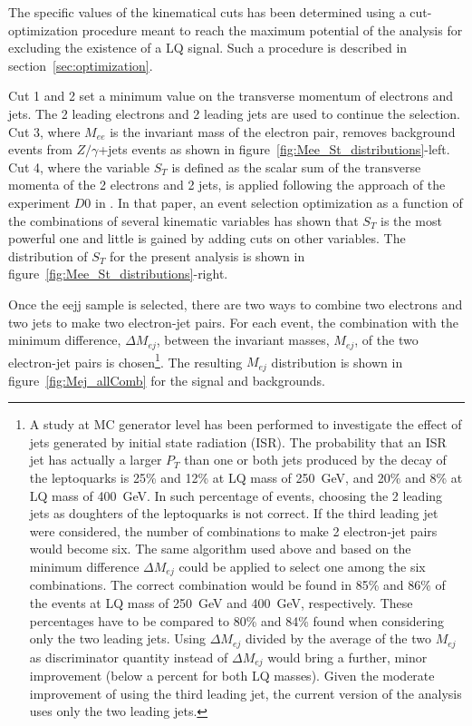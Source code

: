 The specific values of the kinematical cuts has been determined using a cut-optimization procedure meant to
reach the maximum potential of the analysis for excluding the existence of a LQ signal. 
Such a procedure is described in section~\ref{sec:optimization}.

Cut 1 and 2 set a minimum value on the transverse momentum of electrons and jets. 
The 2 leading electrons and 2 leading jets are used to continue the selection.
Cut 3, where $M_{ee}$ is the invariant mass of the electron pair, removes background events from 
$Z/\gamma$+jets events as shown in figure~\ref{fig:Mee_St_distributions}-left.
Cut 4, where the variable $S_T$ is defined as the scalar sum of the transverse momenta of the 
2 electrons and 2 jets, is applied following the approach of the experiment $D0$ in 
\cite{Abazov:2001mx}. In that paper, an event selection optimization as a function of
the combinations of several kinematic variables has shown that $S_T$ is the most powerful one 
and little is gained by adding cuts on other variables. The distribution of $S_T$ for the present
analysis is shown in figure~\ref{fig:Mee_St_distributions}-right.

Once the eejj sample is selected, there are two ways to combine two electrons and two jets to make two electron-jet pairs. 
For each event, the combination with the minimum difference, $\Delta M_{ej}$, between the invariant masses, $M_{ej}$, 
of the two electron-jet pairs is chosen\footnote{
A study at MC generator level has been performed to investigate the effect of jets generated by initial state 
radiation (ISR). The probability that an ISR jet has actually a larger $P_T$ than one or both jets produced 
by the decay of the leptoquarks is 25\% and 12\% at LQ mass of 250~GeV, and 20\% and 8\% at LQ mass of 400~GeV. 
In such percentage of events, choosing the 2 leading jets as doughters of the leptoquarks is not correct. 
If the third leading jet were considered, the number of combinations to make 2 electron-jet pairs would become six.
The same algorithm used above and based on the minimum difference $\Delta M_{ej}$ could be applied to select one 
among the six combinations. The correct combination would be found in 85\% and 86\% of the events at LQ mass of 250~GeV
and 400~GeV, respectively. These percentages have to be compared to 80\% and 84\% found when considering only the two leading 
jets. 
Using $\Delta M_{ej}$ divided by the average of the two $M_{ej}$ as discriminator quantity instead of $\Delta M_{ej}$ 
would bring a further, minor improvement (below a percent for both LQ masses).
Given the moderate improvement of using the third leading jet, the current version of the analysis uses only the two leading jets.
}. 
The resulting $M_{ej}$ distribution is shown in figure~\ref{fig:Mej_allComb} for the signal and backgrounds. 


